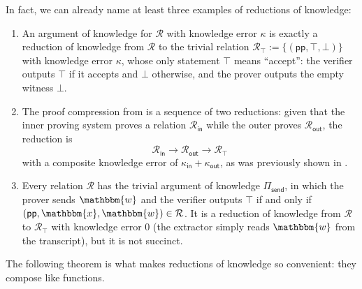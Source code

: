 \documentclass[../../book.tex]{subfiles}
\begin{document}
\begin{example}\label{example:reductions-of-knowledge}
    In fact, we can already name at least three examples of reductions of knowledge:
    \begin{enumerate}
        \item An argument of knowledge for $\mathcal{R}$ with knowledge error $\kappa$ is exactly a reduction of knowledge from $\mathcal{R}$ to the trivial relation $\mathcal{R}_{\top} := \{(\mathsf{pp}, \top, \bot)\}$ with knowledge error $\kappa$, whose only statement $\top$ means ``accept'': the verifier outputs $\top$ if it accepts and $\bot$ otherwise, and the prover outputs the empty witness $\bot$.
        \item The proof compression from  is a sequence of two reductions: given that the inner proving system proves a relation $\mathcal{R}_{\mathsf{in}}$ while the outer proves $\mathcal{R}_{\mathsf{out}}$, the reduction is
        \begin{equation*}
            \mathcal{R}_{\mathsf{in}} \to \mathcal{R}_{\mathsf{out}} \to \mathcal{R}_{\top}
        \end{equation*}
        with a composite knowledge error of $\kappa_{\mathsf{in}} + \kappa_{\mathsf{out}}$, as was previously shown in .
        \item Every relation $\mathcal{R}$ has the trivial argument of knowledge $\Pi_{\mathsf{send}}$, in which the prover sends $\mathbbm{w}$ and the verifier outputs $\top$ if and only if $(\mathsf{pp}, \mathbbm{x}, \mathbbm{w}) \in \mathcal{R}$. 
        It is a reduction of knowledge from $\mathcal{R}$ to $\mathcal{R}_{\top}$ with knowledge error $0$ (the extractor simply reads $\mathbbm{w}$ from the transcript), but it is not succinct.
    \end{enumerate}
\end{example}

The following theorem is what makes reductions of knowledge so convenient: they compose like functions.
\end{document}
